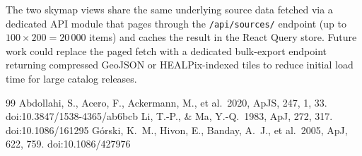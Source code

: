 \documentclass[11pt, a4paper]{article}
\begin{document}
The two skymap views share the same underlying source data fetched via a dedicated API module that pages through the \texttt{/api/sources/} endpoint (up to $100 \times 200 = 20\,000$ items) and caches the result in the React Query store.
Future work could replace the paged fetch with a dedicated bulk-export endpoint returning compressed GeoJSON or HEALPix-indexed tiles to reduce initial load time for large catalog releases.

\clearpage
\begin{thebibliography}{99}
 Abdollahi, S., Acero, F., Ackermann, M., et al.\ 2020, ApJS, 247, 1, 33. doi:10.3847/1538-4365/ab6bcb
 Li, T.-P., \& Ma, Y.-Q.\ 1983, ApJ, 272, 317. doi:10.1086/161295
 Górski, K.~M., Hivon, E., Banday, A.~J., et al.\ 2005, ApJ, 622, 759. doi:10.1086/427976
\end{thebibliography}
\end{document}
